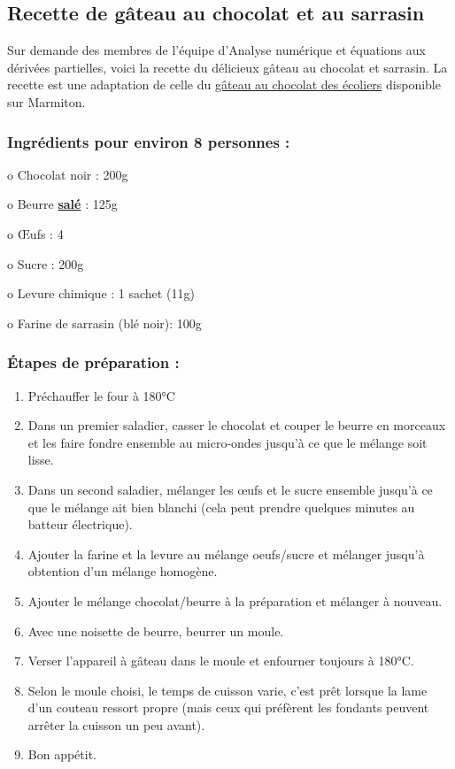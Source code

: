 \documentclass[12pt]{article}
\begin{document}
\subsection{Recette de gâteau au chocolat et au sarrasin}
\label{recette}
Sur demande des membres de l'équipe d'Analyse numérique et équations aux dérivées partielles, voici la recette du délicieux gâteau au chocolat et sarrasin. La recette est une adaptation de celle du \href{https://www.marmiton.org/recettes/recette_gateau-au-chocolat-des-ecoliers_20654.aspx}{gâteau au chocolat des écoliers} disponible sur Marmiton.
\subsubsection*{Ingrédients pour environ 8 personnes :}
\begin{itemize}
\begin{minipage}[t]{0.4\linewidth}
\item[o] Chocolat noir : 200g
\item[o] Beurre \underline{\textbf{salé}} : 125g
\item[o] Œufs : 4
\end{minipage}
\begin{minipage}[t]{0.5\linewidth}
\item[o] Sucre : 200g
\item[o] Levure chimique : 1 sachet (11g)
\item[o] Farine de sarrasin (blé noir): 100g
\end{minipage}
\end{itemize}    
\subsubsection*{Étapes de préparation :}
\begin{enumerate}
    \item Préchauffer le four à 180°C
    \item Dans un premier saladier, casser le chocolat et couper le beurre en morceaux et les faire fondre ensemble au micro-ondes jusqu'à ce que le mélange soit lisse.
    \item Dans un second saladier, mélanger les œufs et le sucre ensemble jusqu'à ce que le mélange ait bien blanchi (cela peut prendre quelques minutes au batteur électrique).
    \item Ajouter la farine et la levure au mélange oeufs/sucre et mélanger jusqu'à obtention d'un mélange homogène.
    \item Ajouter le mélange chocolat/beurre à la préparation et mélanger à nouveau.
    \item Avec une noisette de beurre, beurrer un moule.
    \item Verser l'appareil à gâteau dans le moule et enfourner toujours à 180°C.
    \item Selon le moule choisi, le temps de cuisson varie, c'est prêt lorsque la lame d'un couteau ressort propre (mais ceux qui préfèrent les fondants peuvent arrêter la cuisson un peu avant).
    \item Bon appétit.
\end{enumerate}
\end{document}
